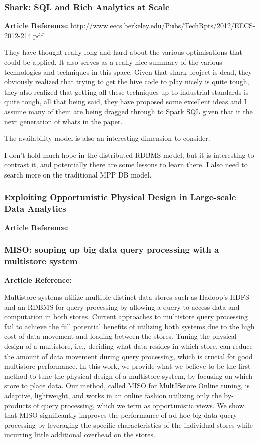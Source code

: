 \documentclass{article}
\begin{document}
\subsubsection{Shark: SQL and Rich Analytics at Scale}

\textbf{Article Reference:} http://www.eecs.berkeley.edu/Pubs/TechRpts/2012/EECS-2012-214.pdf

They have thought really long and hard about the various optimisations that could be applied. It also serves as a really nice summary of the various technologies and techniques in this space. Given that shark project is dead, they obviously realized that trying to get the hive code to play nicely is quite tough, they also realized that getting all these techniques up to industrial standards is quite tough, all that being said, they have proposed some excellent ideas and I assume many of them are being dragged through to Spark SQL given that it the next generation of whats in the paper. 

The availability model is also an interesting dimension to consider. 

I don't hold much hope in the distributed RDBMS model, but it is interesting to contrast it, and potentially there are some lessons to learn there. I also need to search more on the traditional MPP DB model.


\subsubsection{Exploiting Opportunistic Physical Design in Large-scale
               Data Analytics}

\textbf{Article Reference:} \cite{DBLP:journals/corr/abs-1303-6609}

\subsubsection{MISO: souping up big data query processing with a multistore system}

\textbf{Arcticle Reference:} \cite{LeFevre:2014:MSU:2588555.2588568}

Multistore systems utilize multiple distinct data stores such as Hadoop's HDFS and an RDBMS for query processing by allowing a query to access data and computation in both stores. Current approaches to multistore query processing fail to achieve the full potential benefits of utilizing both systems due to the high cost of data movement and loading between the stores. Tuning the physical design of a multistore, i.e., deciding what data resides in which store, can reduce the amount of data movement during query processing, which is crucial for good multistore performance. In this work, we provide what we believe to be the first method to tune the physical design of a multistore system, by focusing on which store to place data. Our method, called MISO for MultISstore Online tuning, is adaptive, lightweight, and works in an online fashion utilizing only the by-products of query processing, which we term as opportunistic views. We show that MISO significantly improves the performance of ad-hoc big data query processing by leveraging the specific characteristics of the individual stores while incurring little additional overhead on the stores.
\end{document}
